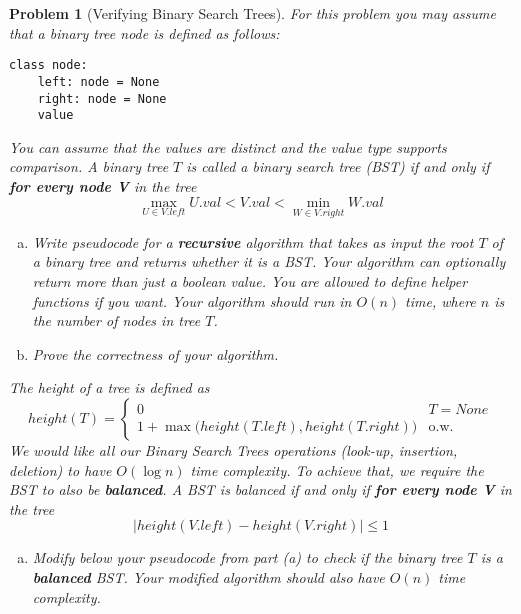 \documentclass[10pt]{article}
\newtheorem{problem}{\sc\color{cit}Problem}
\begin{document}
\begin{problem}[Verifying Binary Search Trees]
For this problem you may assume that a binary tree node is defined as follows:

\begin{verbatim}
class node:
    left: node = None
    right: node = None
    value
\end{verbatim}
You can assume that the values are distinct and the value type supports comparison.
A binary tree $T$ is called a binary search tree (BST) if and only if \textbf{for every node V} in the tree
\[\max_{U \in V.left} U.val < V.val < \min_{W \in V.right} W.val\]

\begin{enumerate}[(a)]
    \item Write pseudocode for a \textbf{recursive} algorithm that takes as input the root $T$ of a binary tree and returns whether it is a BST. Your algorithm can optionally return more than just a boolean value. You are allowed to define helper functions if you want. Your algorithm should run in $O(n)$ time, where $n$ is the number of nodes in tree $T$.

    \item Prove the correctness of your algorithm.
\end{enumerate}
The height of a tree is defined as 
\[height(T) = \begin{cases} 0 & T = None \\
1 + \max\big(height(T.left), height(T.right)\big) & \text{o.w.}\end{cases}\]
We would like all our Binary Search Trees operations (look-up, insertion, deletion) to have $O(\log n)$ time complexity. To achieve that, we require the BST to also be \textbf{balanced}.
A BST is balanced if and only if \textbf{for every node V} in the tree
\[\big|height(V.left) - height(V.right)\big| \leq 1\]

\begin{enumerate}[(a),resume]
    \item Modify below your pseudocode from part (a) to check if the binary tree $T$ is a \textbf{balanced} BST. Your modified algorithm should also have $O(n)$ time complexity.
\end{enumerate}
\end{problem}
\end{document}
